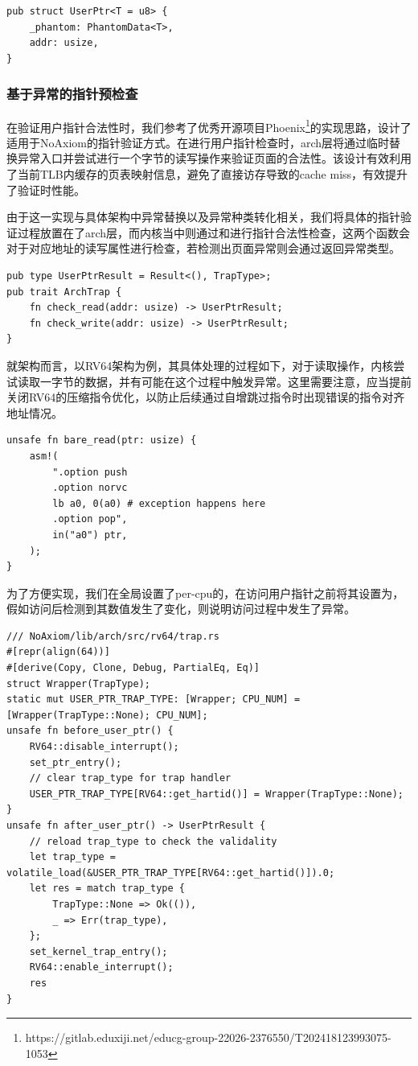 \documentclass{article}
\begin{document}
\begin{lstlisting}
pub struct UserPtr<T = u8> {
    _phantom: PhantomData<T>,
    addr: usize,
}
\end{lstlisting}

\subsubsection{基于异常的指针预检查}\label{sec:user-ptr-check}

在验证用户指针合法性时，我们参考了优秀开源项目Phoenix\footnote{https://gitlab.eduxiji.net/educg-group-22026-2376550/T202418123993075-1053}的实现思路，设计了适用于NoAxiom的指针验证方式。在进行用户指针检查时，arch层将通过临时替换异常入口并尝试进行一个字节的读写操作来验证页面的合法性。该设计有效利用了当前TLB内缓存的页表映射信息，避免了直接访存导致的cache miss，有效提升了验证时性能。

由于这一实现与具体架构中异常替换以及异常种类转化相关，我们将具体的指针验证过程放置在了arch层，而内核当中则通过和进行指针合法性检查，这两个函数会对于对应地址的读写属性进行检查，若检测出页面异常则会通过返回异常类型。

\begin{lstlisting}
pub type UserPtrResult = Result<(), TrapType>;
pub trait ArchTrap {
    fn check_read(addr: usize) -> UserPtrResult;
    fn check_write(addr: usize) -> UserPtrResult;
}
\end{lstlisting}

就架构而言，以RV64架构为例，其具体处理的过程如下，对于读取操作，内核尝试读取一字节的数据，并有可能在这个过程中触发异常。这里需要注意，应当提前关闭RV64的压缩指令优化，以防止后续通过自增跳过指令时出现错误的指令对齐地址情况。

\begin{lstlisting}
unsafe fn bare_read(ptr: usize) {
    asm!(
        ".option push
        .option norvc
        lb a0, 0(a0) # exception happens here
        .option pop",
        in("a0") ptr,
    );
}
\end{lstlisting}

为了方便实现，我们在全局设置了per-cpu的，在访问用户指针之前将其设置为，假如访问后检测到其数值发生了变化，则说明访问过程中发生了异常。

\begin{lstlisting}
/// NoAxiom/lib/arch/src/rv64/trap.rs
#[repr(align(64))]
#[derive(Copy, Clone, Debug, PartialEq, Eq)]
struct Wrapper(TrapType);
static mut USER_PTR_TRAP_TYPE: [Wrapper; CPU_NUM] = [Wrapper(TrapType::None); CPU_NUM];
unsafe fn before_user_ptr() {
    RV64::disable_interrupt();
    set_ptr_entry();
    // clear trap_type for trap handler
    USER_PTR_TRAP_TYPE[RV64::get_hartid()] = Wrapper(TrapType::None);
}
unsafe fn after_user_ptr() -> UserPtrResult {
    // reload trap_type to check the validality
    let trap_type = volatile_load(&USER_PTR_TRAP_TYPE[RV64::get_hartid()]).0;
    let res = match trap_type {
        TrapType::None => Ok(()),
        _ => Err(trap_type),
    };
    set_kernel_trap_entry();
    RV64::enable_interrupt();
    res
}
\end{lstlisting}
\end{document}
